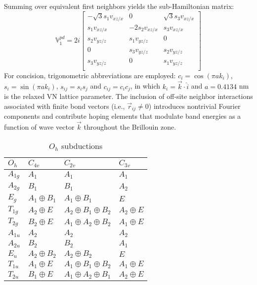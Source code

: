 \documentclass[twocolumn,showpacs,preprintnumbers,superscriptaddress,prb,floatfix,aps,10pt]{revtex4-1}
\begin{document}
%
Summing over equivalent first neighbors yields the sub-Hamiltonian matrix:
%
\begin{equation}
\mathbb{V}_1^{pd} = 2i
\begin{bmatrix}
-\sqrt{3} s_1 v_{xz/x} & 0            & \sqrt{3} s_3 v_{xz/x}  \\ %
 s_1 v_{xz/x}          &-2 s_2 v_{xz/x} &  s_3 v_{xz/x}          \\ %
 s_2 v_{yz/z}          &  s_1 v_{yz/z}  & 0                    \\
0                    &  s_3 v_{yz/z}  &  s_2 v_{yz/z}          \\
 s_3 v_{yz/z}          & 0            &  s_1 v_{yz/z}          \\
\end{bmatrix}
\end{equation}
%
For concision, trigonometric abbreviations are employed: $c_i = \cos(\pi a k_i)$, $s_i = \sin(\pi a k_i)$, $s_{ij} = s_i s_j$ and $c_{ij} = c_i c_j$, in which $k_i = \vec{k}\cdot\hat{i}$ and $a = 0.4134$ nm is the relaxed VN lattice parameter. The inclusion of off-site neighbor interactions associated with finite bond vectors (i.e., $\vec{r}_{ij} \neq 0$) introduces nontrivial Fourier components and contribute hoping elements that modulate band energies as a function of wave vector $\vec{k}$ throughout the Brillouin zone. 
%
\begin{table}
\caption{\label{table:subduction} $O_h$ subductions}
\begin{ruledtabular}
\begin{tabular*}{10cm}{llll}
$O_h$    & $C_{4v}$         & $C_{2v}$                              &   $C_{3v}$            \\ \hline
$A_{1g}$ & $A_1$            & $A_{1}$                               &   $A_1$               \\ 
$A_{2g}$ & $B_1$            & $B_{1}$                               &   $A_2$               \\ 
$E_g   $ & $A_1 \oplus B_1$ & $A_{1} \oplus B_{1}$                  &   $E$                 \\ 
$T_{1g}$ & $A_2 \oplus E$   & $A_{2} \oplus B_{1} \oplus B_{2}$     &   $A_2 \oplus E$      \\ 
$T_{2g}$ & $B_2 \oplus E$   & $A_{1} \oplus A_{2} \oplus B_{2}$     &   $A_1 \oplus E$      \\ 
$A_{1u}$ & $A_2$            & $A_{2}$                               &   $A_2$               \\ 
$A_{2u}$ & $B_2$            & $B_{2}$                               &   $A_1$               \\ 
$E_u   $ & $A_2 \oplus B_2$ & $A_{2} \oplus B_{2}$                  &   $E$                 \\ 
$T_{1u}$ & $A_1 \oplus E$   & $A_{1} \oplus B_{1} \oplus B_{2}$     &   $A_1 \oplus E$      \\ 
$T_{2u}$ & $B_1 \oplus E$   & $A_{1} \oplus A_{2} \oplus B_{1}$     &   $A_2 \oplus E$      \\ 
\end{tabular*}
\end{ruledtabular}
\end{table}
%
\end{document}

